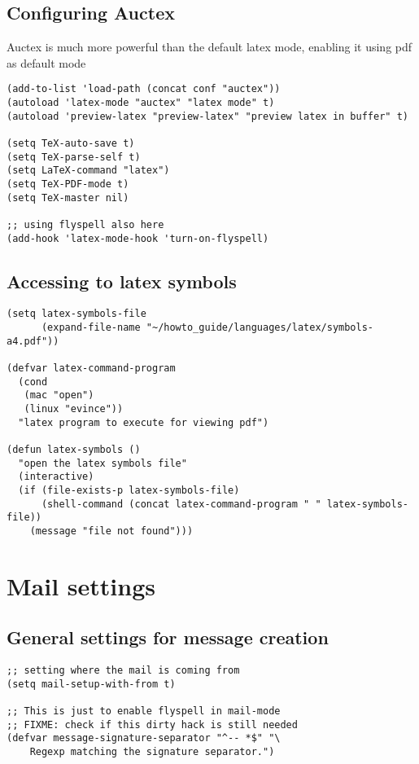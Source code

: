 \documentclass[11pt]{article}
\begin{document}
\subsection{Configuring Auctex}
\label{sec-33.1}

   Auctex is much more powerful than the default latex mode, enabling it using pdf as default mode
\begin{verbatim}
(add-to-list 'load-path (concat conf "auctex"))
(autoload 'latex-mode "auctex" "latex mode" t)
(autoload 'preview-latex "preview-latex" "preview latex in buffer" t)

(setq TeX-auto-save t)
(setq TeX-parse-self t)
(setq LaTeX-command "latex")
(setq TeX-PDF-mode t)
(setq TeX-master nil)

;; using flyspell also here
(add-hook 'latex-mode-hook 'turn-on-flyspell)
\end{verbatim}
\subsection{Accessing to latex symbols}
\label{sec-33.2}

\begin{verbatim}
(setq latex-symbols-file
      (expand-file-name "~/howto_guide/languages/latex/symbols-a4.pdf"))

(defvar latex-command-program
  (cond
   (mac "open")
   (linux "evince"))
  "latex program to execute for viewing pdf")

(defun latex-symbols ()
  "open the latex symbols file"
  (interactive)
  (if (file-exists-p latex-symbols-file)
      (shell-command (concat latex-command-program " " latex-symbols-file))
    (message "file not found")))
\end{verbatim}
\section{Mail settings}
\label{sec-34}
\subsection{General settings for message creation}
\label{sec-34.1}


\begin{verbatim}
;; setting where the mail is coming from
(setq mail-setup-with-from t)

;; This is just to enable flyspell in mail-mode
;; FIXME: check if this dirty hack is still needed
(defvar message-signature-separator "^-- *$" "\
    Regexp matching the signature separator.")
\end{verbatim}
\end{document}
